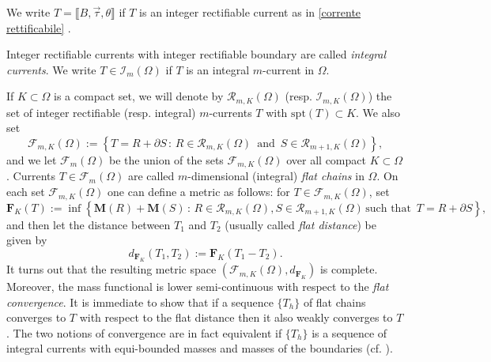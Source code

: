 \documentclass[a4paper,11pt,reqno]{amsart}
\newtheorem{theorem}{Theorem}[section]
\theoremstyle{definition}
\numberwithin{equation}{section}
\numberwithin{subsection}{section}
\newcommand{\M}{\mathbf{M}}
\newcommand{\Rc}{\mathscr{R}}
\newcommand{\I}{\mathscr{I}}
\newcommand{\Fl}{\mathbf{F}}
\newcommand{\F}{\mathscr{F}}
\newcommand{\spt}{\mathrm{spt}}
\newcommand{\weakto}{\rightharpoonup}
\begin{document}
We write $T = \llbracket B, \vec{\tau}, \theta \rrbracket$ if $T$ is an integer rectifiable current as in \eqref{corrente rettificabile} .

Integer rectifiable currents with integer rectifiable boundary are called \emph{integral currents}. We write $T \in \I_{m}(\Omega)$ if $T$ is an integral $m$-current in $\Omega$. 


If $K \subset \Omega$ is a compact set, we will denote by $\Rc_{m,K}(\Omega)$ (resp. $\I_{m,K}(\Omega)$) the set of integer rectifiable (resp. integral) $m$-currents $T$ with $\spt(T) \subset K$. We also set
\[
\F_{m,K}(\Omega) := \left\lbrace T = R + \partial S \, \colon \, R \in \Rc_{m,K}(\Omega) \, \mbox{ and } \, S \in \Rc_{m+1,K}(\Omega) \right\rbrace,
\]
and we let $\F_{m}(\Omega)$ be the union of the sets $\F_{m,K}(\Omega)$ over all compact $K \subset \Omega$. Currents $T \in \F_{m}(\Omega)$ are called $m$-dimensional (integral) \emph{flat chains} in $\Omega$. On each set $\F_{m,K}(\Omega)$ one can define a metric as follows:  for $T \in \F_{m,K}(\Omega)$, set
\[
\Fl_{K}(T) := \inf\left\lbrace \M(R) + \M(S) \, \colon \, R \in \Rc_{m,K}(\Omega), S \in \Rc_{m+1,K}(\Omega) \, \mbox{such that } \, T = R + \partial S \right\rbrace,
\] 
and then let the distance between $T_{1}$ and $T_{2}$ (usually called \emph{flat distance}) be given by
\[
d_{\Fl_{K}}(T_{1}, T_{2}) := \Fl_{K}(T_{1} - T_{2}).
\]
It turns out that the resulting metric space $\left( \F_{m,K}(\Omega), d_{\Fl_K} \right)$ is complete. Moreover, the mass functional is lower semi-continuous with respect to the \emph{flat convergence}. It is immediate to show that if a sequence $\{T_{h}\}$ of flat chains converges to $T$ with respect to the flat distance then it also weakly converges to $T$. The two notions of convergence are in fact equivalent if $\{ T_{h} \}$ is a sequence of integral currents with equi-bounded masses and masses of the boundaries (cf. \cite[Theorem 31.2]{Sim83}). 
\end{document}
